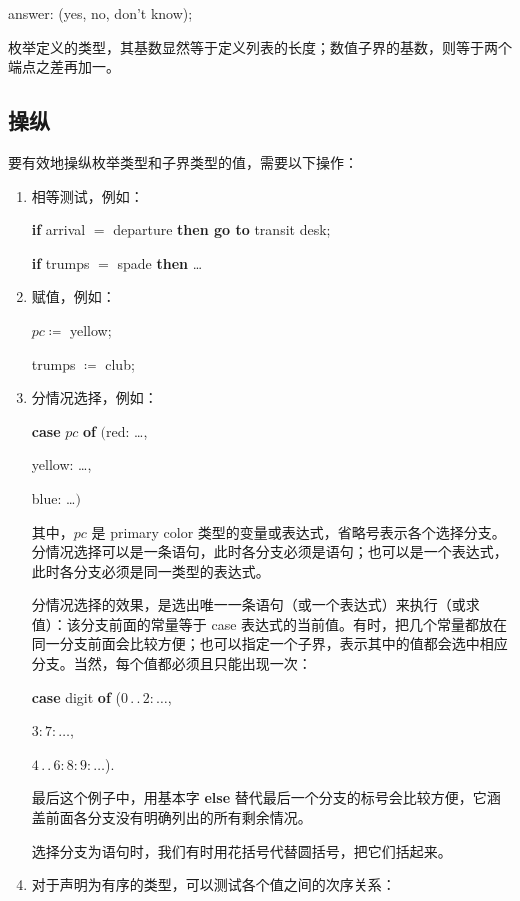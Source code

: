 \documentclass[twoside,11pt,fontset=none]{ctexbook}
\begin{document}
\quad answer: (yes, no, don't know);

枚举定义的类型，其基数显然等于定义列表的长度；数值子界的基数，则等于两个端点之差再加一。

\subsection{操纵}

要有效地操纵枚举类型和子界类型的值，需要以下操作：

\begin{enumerate}[wide, nosep, label=(\arabic*)]
	\item 相等测试，例如：

	\quad \textbf{if} arrival $=$ departure \textbf{then go to} transit desk;

	\quad \textbf{if} trumps $=$ spade \textbf{then} \dots

	\item 赋值，例如：

	\quad $pc \coloneq$ yellow;

	\quad trumps $\coloneq$ club;

	\item \label{en:manipulation-3}
	分情况选择，例如：

	\quad \textbf{case} $pc$ \textbf{of} $($red: \dots,

	\tabto{5.7em}yellow: \dots,

	\tabto{5.7em}blue: \dots$)$
	
	\noindent
	其中，$pc$ 是 primary color 类型的变量或表达式，省略号表示各个选择分支。分情况选择可以是一条语句，此时各分支必须是语句；也可以是一个表达式，此时各分支必须是同一类型的表达式。
	
	分情况选择的效果，是选出唯一一条语句（或一个表达式）来执行（或求值）：该分支前面的常量等于 case 表达式的当前值。有时，把几个常量都放在同一分支前面会比较方便；也可以指定一个子界，表示其中的值都会选中相应分支。当然，每个值都必须且只能出现一次：
	
	\quad \textbf{case} digit \textbf{of} ($0\,.\,.\,2:\dots$,
	
	\tabto{6.6em}$3:7:\dots$,
	
	\tabto{6.6em}$4\,.\,.\,6:8:9:\dots$).
	
	\noindent
	最后这个例子中，用基本字 \textbf{else} 替代最后一个分支的标号会比较方便，它涵盖前面各分支没有明确列出的所有剩余情况。
	
	选择分支为语句时，我们有时用花括号代替圆括号，把它们括起来。
	
	\item 对于声明为有序的类型，可以测试各个值之间的次序关系：
	

\end{enumerate}
\end{document}

